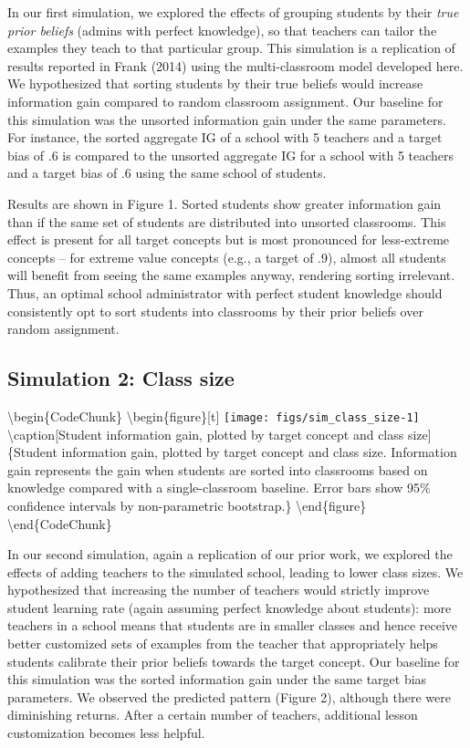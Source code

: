 \documentclass[10pt, letterpaper]{article}
\begin{document}
In our first simulation, we explored the effects of grouping students by
their \emph{true prior beliefs} (admins with perfect knowledge), so that
teachers can tailor the examples they teach to that particular group.
This simulation is a replication of results reported in Frank (2014)
using the multi-classroom model developed here. We hypothesized that
sorting students by their true beliefs would increase information gain
compared to random classroom assignment. Our baseline for this
simulation was the unsorted information gain under the same parameters.
For instance, the sorted aggregate IG of a school with 5 teachers and a
target bias of .6 is compared to the unsorted aggregate IG for a school
with 5 teachers and a target bias of .6 using the same school of
students.

Results are shown in Figure 1. Sorted students show greater information
gain than if the same set of students are distributed into unsorted
classrooms. This effect is present for all target concepts but is most
pronounced for less-extreme concepts -- for extreme value concepts
(e.g., a target of .9), almost all students will benefit from seeing the
same examples anyway, rendering sorting irrelevant. Thus, an optimal
school administrator with perfect student knowledge should consistently
opt to sort students into classrooms by their prior beliefs over random
assignment.

\subsection{Simulation 2: Class size}\label{simulation-2-class-size}

\textbackslash{}begin\{CodeChunk\}
\textbackslash{}begin\{figure\}{[}t{]}
\texttt{[image: figs/sim\_class\_size-1]}
\textbackslash{}caption{[}Student information gain, plotted by target
concept and class size{]}\{Student information gain, plotted by target
concept and class size. Information gain represents the gain when
students are sorted into classrooms based on knowledge compared with a
single-classroom baseline. Error bars show 95\% confidence intervals by
non-parametric bootstrap.\}\label{fig:sim_class_size}
\textbackslash{}end\{figure\} \textbackslash{}end\{CodeChunk\}

In our second simulation, again a replication of our prior work, we
explored the effects of adding teachers to the simulated school, leading
to lower class sizes. We hypothesized that increasing the number of
teachers would strictly improve student learning rate (again assuming
perfect knowledge about students): more teachers in a school means that
students are in smaller classes and hence receive better customized sets
of examples from the teacher that appropriately helps students calibrate
their prior beliefs towards the target concept. Our baseline for this
simulation was the sorted information gain under the same target bias
parameters. We observed the predicted pattern (Figure 2), although there
were diminishing returns. After a certain number of teachers, additional
lesson customization becomes less helpful.
\end{document}
